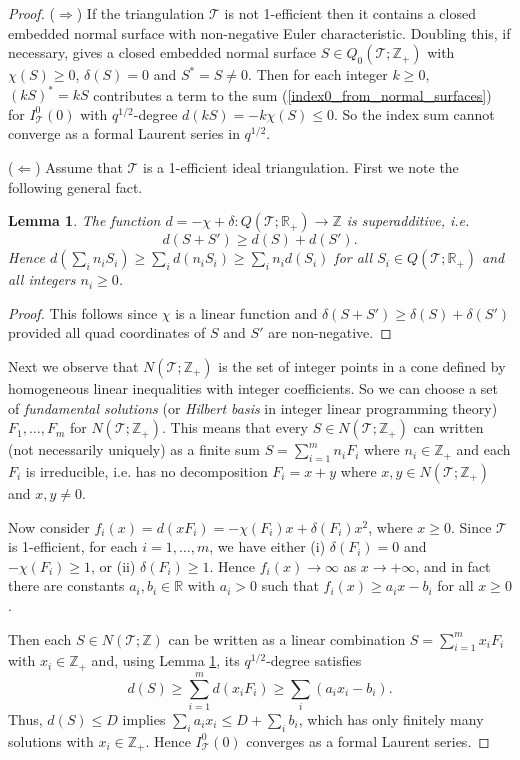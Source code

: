 \documentclass[12pt,reqno]{amsart}  %
\newtheorem{lemma}[thm]{Lemma}
\theoremstyle{definition}
\theoremstyle{remark}
\def\R{\mathbb{R}}
\newcommand{\T}{\mathcal{T}}
\def\Z{\mathbb Z}
\begin{document}
\begin{proof}
($\Rightarrow$) If the triangulation $\T$ is not 1-efficient then it 
contains a closed embedded normal surface  with non-negative Euler 
characteristic. Doubling this, if necessary, gives a closed embedded 
normal surface $S \in Q_0(\T;\Z_+)$ with
$\chi(S)\ge 0$, $\delta(S)=0$ and $S^*=S \ne 0$. 
Then for each integer $k\ge0$, $(kS)^* = k S$ contributes a term to the sum
(\ref{index0_from_normal_surfaces}) for $I_\T^0(0)$
with $q^{1/2}$-degree $d(kS) = -k\chi(S) \le 0$. So the index sum
cannot converge as a formal Laurent series in $q^{1/2}$.
 
($\Leftarrow$) Assume that  $\T$ is a 1-efficient ideal triangulation.  
First we note the following general fact.

\begin{lemma} 
\label{subadditive}
The function $d = -\chi + \delta: Q(\T;\R_+) \to \Z$ is superadditive, i.e.
$$
d(S+S') \ge d(S)+d(S').
$$
Hence $d(\sum_i n_i S_i) \ge \sum_i d(n_i S_i) \ge \sum_i n_i d(S_i)$ for 
all $S_i \in Q(\T;\R_+)$ and all integers $n_i \ge 0$.
\end{lemma} 

\begin{proof}
This follows since $\chi$ is a linear function and $\delta(S+S') 
\ge \delta(S)+\delta(S')$ provided all quad coordinates of $S$ and $S'$ 
are non-negative.
\end{proof}

Next we observe that $N(\T;\Z_+)$ is the set of integer points in a cone 
defined by homogeneous linear inequalities with integer coefficients. 
So we can choose a set of {\em fundamental solutions} 
(or {\em Hilbert basis} in integer linear programming theory) 
$F_1, \ldots,  F_m$  for  $N(\T;\Z_+)$. This means that every 
$S \in N(\T;\Z_+)$ can written (not necessarily uniquely)
as a finite sum $S= \sum_{i=1}^m n_i F_i$ 
where $n_i \in \Z_+$ and each $F_i$ is irreducible, i.e. has no 
decomposition $F_i=x+y$ where $x,y \in N(\T;\Z_+)$ and $x,y \ne 0$.

Now consider $f_i(x) = d(x F_i) = -\chi(F_i)x+\delta(F_i) x^2$, where $x \ge 0$.
Since $\T$ is 1-efficient, for each $i=1,\ldots,m$, we have either
(i) $\delta(F_i)=0$ and $-\chi(F_i) \ge 1$, or (ii) $\delta(F_i) \ge 1$.
Hence $f_i(x) \to \infty$ as $x \to +\infty$,  and in fact there are 
constants $a_i,b_i  \in \R$ with $a_i >0$ such that
$f_i(x) \ge a_i x - b_i$ for all $x \ge 0$.

Then each $S\in N(\T;\Z)$ can be written as a linear combination 
$S= \sum_{i=1}^m x_i F_i$ with $x_i \in \Z_+$
and, using Lemma  \ref{subadditive},  its $q^{1/2}$-degree satisfies 
$$d(S) \ge \sum_{i=1}^m d(x_i F_i) \ge \sum_i (a_i x_i -b_i).$$
Thus, $d(S) \le D$ implies $\sum_i a_i x_i \le D + \sum_i b_i$,
which has only finitely many solutions with $x_i \in \Z_+$. Hence $I_\T^0(0)$  
converges as a formal Laurent series.
\end{proof}
\end{document}
